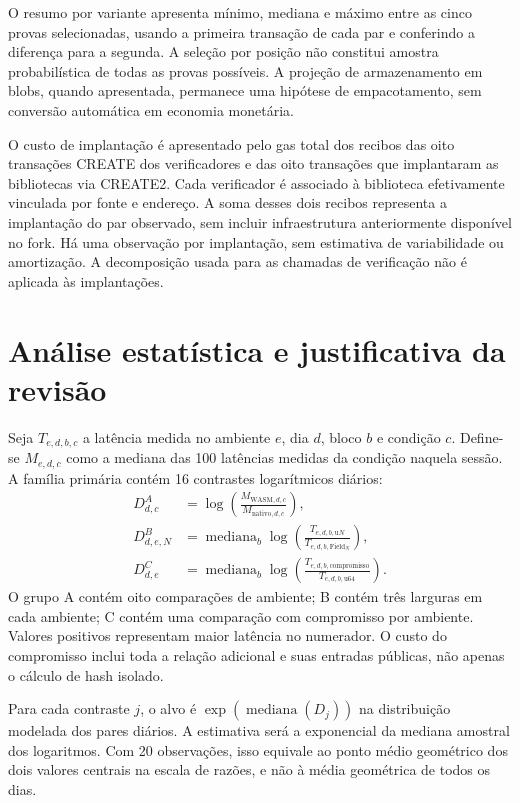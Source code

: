 O resumo por variante apresenta mínimo, mediana e máximo entre as cinco provas selecionadas, usando a primeira transação de cada par e conferindo a diferença para a segunda. A seleção por posição não constitui amostra probabilística de todas as provas possíveis. A projeção de armazenamento em blobs, quando apresentada, permanece uma hipótese de empacotamento, sem conversão automática em economia monetária.

O custo de implantação é apresentado pelo gas total dos recibos das oito transações CREATE dos verificadores e das oito transações que implantaram as bibliotecas via CREATE2. Cada verificador é associado à biblioteca efetivamente vinculada por fonte e endereço. A soma desses dois recibos representa a implantação do par observado, sem incluir infraestrutura anteriormente disponível no fork. Há uma observação por implantação, sem estimativa de variabilidade ou amortização. A decomposição usada para as chamadas de verificação não é aplicada às implantações.

\section{Análise estatística e justificativa da revisão}

Seja $T_{e,d,b,c}$ a latência medida no ambiente $e$, dia $d$, bloco $b$ e condição $c$. Define-se $M_{e,d,c}$ como a mediana das 100 latências medidas da condição naquela sessão. A família primária contém 16 contrastes logarítmicos diários:
\begin{align}
 D^{A}_{d,c} &= \log\left(\frac{M_{\mathrm{WASM},d,c}}{M_{\mathrm{nativo},d,c}}\right), \\
 D^{B}_{d,e,N} &= \operatorname{mediana}_{b}\log\left(\frac{T_{e,d,b,\mathrm{u}N}}{T_{e,d,b,\mathrm{Field}_{N}}}\right), \\
 D^{C}_{d,e} &= \operatorname{mediana}_{b}\log\left(\frac{T_{e,d,b,\mathrm{compromisso}}}{T_{e,d,b,\mathrm{u64}}}\right).
\end{align}
O grupo A contém oito comparações de ambiente; B contém três larguras em cada ambiente; C contém uma comparação com compromisso por ambiente. Valores positivos representam maior latência no numerador. O custo do compromisso inclui toda a relação adicional e suas entradas públicas, não apenas o cálculo de hash isolado.

Para cada contraste $j$, o alvo é $\exp(\operatorname{mediana}(D_j))$ na distribuição modelada dos pares diários. A estimativa será a exponencial da mediana amostral dos logaritmos. Com 20 observações, isso equivale ao ponto médio geométrico dos dois valores centrais na escala de razões, e não à média geométrica de todos os dias.

